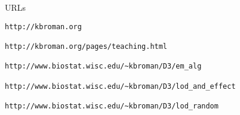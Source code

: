 \documentclass[12pt]{article}
\newcommand{\headsize}{\fontsize{35}{35} \selectfont}
\begin{document}
\newpage

\headsize \color{myyellow}
\hfill \begin{minipage}{5.75in}
\centering
URLs
\end{minipage}

\vspace{2cm}

\begin{verbatim}
http://kbroman.org

http://kbroman.org/pages/teaching.html

http://www.biostat.wisc.edu/~kbroman/D3/em_alg

http://www.biostat.wisc.edu/~kbroman/D3/lod_and_effect

http://www.biostat.wisc.edu/~kbroman/D3/lod_random
\end{verbatim}
\end{document}
